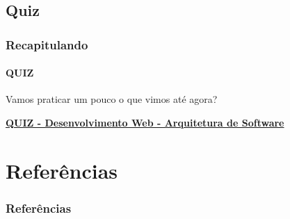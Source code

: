 \documentclass[
	10pt, %
	t, %
]{beamer}
\begin{document}
\subsection{Quiz}

\begin{frame}
	\frametitle{Recapitulando}
	\framesubtitle{QUIZ}

	Vamos praticar um pouco o que vimos até agora?
	\vfill

	\bigskip
	\centering

	\href{https://quizizz.com/admin/quiz/65832b860b273f1989868234?source=quiz_share}{\textbf{QUIZ - Desenvolvimento Web - Arquitetura de Software}}
	\vfill
		
\end{frame}








\section{Referências}

\begin{frame}
	\frametitle{Referências}
	\printbibliography
\end{frame}

\end{document}
